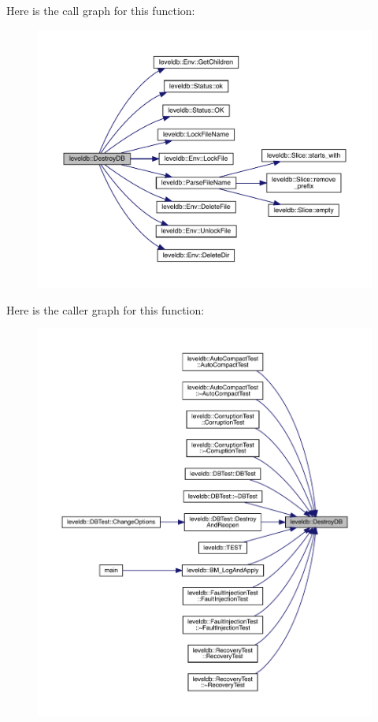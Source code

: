 Here is the call graph for this function\+:
\nopagebreak
\begin{figure}[H]
\begin{center}
\leavevmode
\includegraphics[width=350pt]{namespaceleveldb_aa8b29424fdd7d5113876e89682d68e6f_cgraph}
\end{center}
\end{figure}
Here is the caller graph for this function\+:
\nopagebreak
\begin{figure}[H]
\begin{center}
\leavevmode
\includegraphics[width=350pt]{namespaceleveldb_aa8b29424fdd7d5113876e89682d68e6f_icgraph}
\end{center}
\end{figure}
\mbox{\label{namespaceleveldb_ad50cdd0c24cae7dc81faa1735725ddb9}} 
